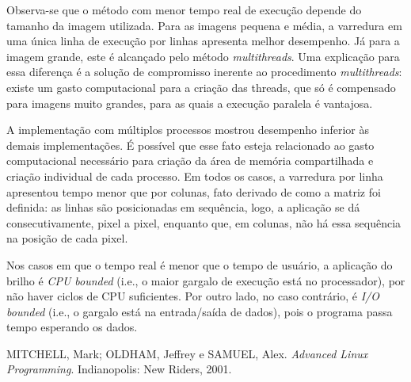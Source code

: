 \documentclass[a4paper, 10pt, conference]{ieeeconf}
\begin{document}
Observa-se que o método com menor tempo real de execução depende do tamanho da imagem utilizada. Para as imagens pequena e média, a varredura em uma única linha de execução por linhas apresenta melhor desempenho. Já para a imagem grande, este é alcançado pelo método \textit{multithreads}. Uma explicação para essa diferença é a solução de compromisso inerente ao procedimento \textit{multithreads}: existe um gasto computacional para a criação das threads, que só é compensado para imagens muito grandes, para as quais a execução paralela é vantajosa.

A implementação com múltiplos processos mostrou desempenho inferior às demais implementações. É possível que esse fato esteja relacionado ao gasto computacional necessário para criação da área de memória compartilhada e criação individual de cada processo. Em todos os casos, a varredura por linha apresentou tempo menor que por colunas, fato derivado de como a matriz foi definida: as linhas são posicionadas em sequência, logo, a aplicação se dá consecutivamente, pixel a pixel, enquanto que, em colunas, não há essa sequência na posição de cada pixel.

Nos casos em que o tempo real é menor que o tempo de usuário, a aplicação do brilho é \textit{CPU bounded} (i.e., o maior gargalo de execução está no processador), por não haver ciclos de CPU suficientes. Por outro lado, no caso contrário, é \textit{I/O bounded} (i.e., o gargalo está na entrada/saída de dados), pois o programa passa tempo esperando os dados.

\begin{thebibliography}{99}

 MITCHELL, Mark; OLDHAM, Jeffrey e SAMUEL, Alex. \textit{Advanced Linux Programming}. Indianopolis: New Riders, 2001.

\end{thebibliography}
\end{document}
